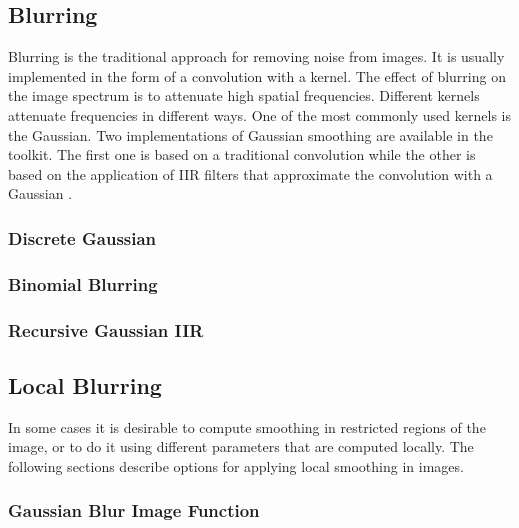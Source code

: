 \subsection{Blurring}
\label{sec:BlurringFilters}

Blurring is the traditional approach for removing noise from images. It is
usually implemented in the form of a convolution with a kernel. The effect of
blurring on the image spectrum is to attenuate high spatial
frequencies.  Different kernels attenuate frequencies in different ways. One
of the most commonly used kernels is the Gaussian. Two implementations of
Gaussian smoothing are available in the toolkit. The first one is based on a
traditional convolution while the other is based on the application of IIR
filters that approximate the convolution with a Gaussian
\cite{Deriche1990,Deriche1993}.

\subsubsection{Discrete Gaussian}
\label{sec:DiscreteGaussianImageFilter}

\ifitkFullVersion

\fi


\subsubsection{Binomial Blurring}
\label{sec:BinomialBlurImageFilter}

\ifitkFullVersion

\fi

\subsubsection{Recursive Gaussian IIR}
\label{sec:RecursiveGaussianImageFilter}

\ifitkFullVersion

\fi


\subsection{Local Blurring}
\label{sec:BlurringFunctions}

In some cases it is desirable to compute smoothing in restricted regions of the
image, or to do it using different parameters that are computed locally.  The
following sections describe options for applying local smoothing in images.

\subsubsection{Gaussian Blur Image Function}
\label{sec:GaussianBlurImageFunction}

